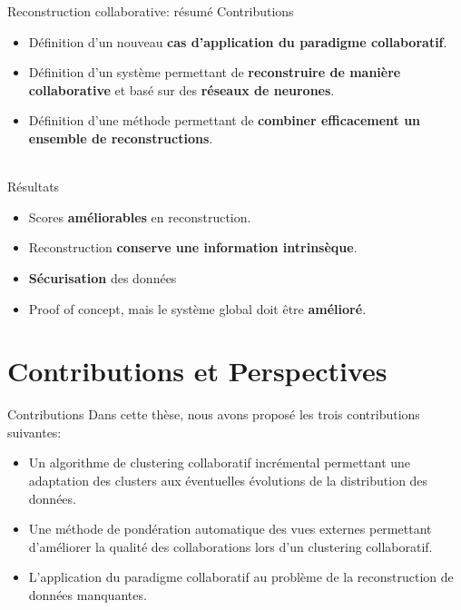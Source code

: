\documentclass[hyperref={pdfpagelabels=false}]{beamer}
\begin{document}
    \begin{frame}{Reconstruction collaborative: résumé}
        Contributions
        \begin{itemize}
            \item Définition d'un nouveau \textbf{cas d'application du paradigme
                collaboratif}.
            \item Définition d'un système permettant de \textbf{reconstruire de manière
                collaborative} et basé sur des \textbf{réseaux de neurones}.
            \item Définition d'une méthode permettant de \textbf{combiner efficacement
                un ensemble de reconstructions}.\\~\\
        \end{itemize}
        Résultats
        \begin{itemize}
            \item Scores \textbf{améliorables} en reconstruction.
            \item Reconstruction \textbf{conserve une information intrinsèque}.
            \item \textbf{Sécurisation} des données
            \item Proof of concept, mais le système global doit être 
                \textbf{amélioré}.

        \end{itemize}
    \end{frame}

    \section{Contributions et Perspectives}
    \begin{frame}{Contributions}
        Dans cette thèse, nous avons proposé les trois contributions suivantes:
        \begin{itemize}
            \item Un algorithme de clustering collaboratif incrémental 
                permettant une adaptation des clusters aux éventuelles 
                évolutions de la distribution des données.
            \item Une méthode de pondération automatique des vues externes 
                permettant d'améliorer la qualité des collaborations lors d'un 
                clustering collaboratif.
            \item L'application du paradigme collaboratif au problème de la 
                reconstruction de données manquantes.
        \end{itemize}
    \end{frame}
\end{document}
